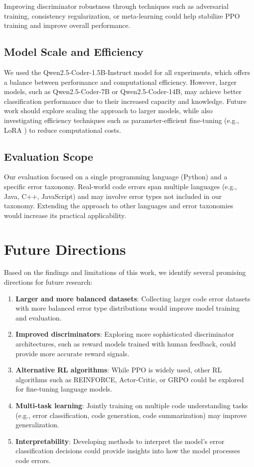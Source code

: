 Improving discriminator robustness through techniques such as adversarial training, consistency regularization, or meta-learning could help stabilize PPO training and improve overall performance.

\subsection{Model Scale and Efficiency}

We used the Qwen2.5-Coder-1.5B-Instruct model for all experiments, which offers a balance between performance and computational efficiency. However, larger models, such as Qwen2.5-Coder-7B or Qwen2.5-Coder-14B, may achieve better classification performance due to their increased capacity and knowledge. Future work should explore scaling the approach to larger models, while also investigating efficiency techniques such as parameter-efficient fine-tuning (e.g., LoRA \cite{hu2022lora}) to reduce computational costs.

\subsection{Evaluation Scope}

Our evaluation focused on a single programming language (Python) and a specific error taxonomy. Real-world code errors span multiple languages (e.g., Java, C++, JavaScript) and may involve error types not included in our taxonomy. Extending the approach to other languages and error taxonomies would increase its practical applicability.

\section{Future Directions}

Based on the findings and limitations of this work, we identify several promising directions for future research:

\begin{enumerate}
    \item \textbf{Larger and more balanced datasets}: Collecting larger code error datasets with more balanced error type distributions would improve model training and evaluation.
    \item \textbf{Improved discriminators}: Exploring more sophisticated discriminator architectures, such as reward models trained with human feedback, could provide more accurate reward signals.
    \item \textbf{Alternative RL algorithms}: While PPO is widely used, other RL algorithms such as REINFORCE, Actor-Critic, or GRPO could be explored for fine-tuning language models.
    \item \textbf{Multi-task learning}: Jointly training on multiple code understanding tasks (e.g., error classification, code generation, code summarization) may improve generalization.
    \item \textbf{Interpretability}: Developing methods to interpret the model's error classification decisions could provide insights into how the model processes code errors.
\end{enumerate}

